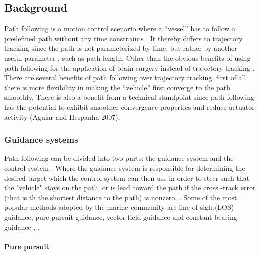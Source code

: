 
\subsection{Background}
Path following is a  motion control scenario where a “vessel” has to follow a predefined path without any time constraints \cite{caharija_integral_2016}. It thereby differs to trajectory tracking since the path is not parameterized by time, but rather by another useful parameter \cite{hung_review_2023}, such as path length. 
Other than the obvious benefits of using path following for the application of brain surgery instead of trajectory tracking  . There are several benefits of path following over trajectory tracking, first of all there is more flexibility in making the “vehicle” first converge to the path smoothly,  
There is also a benefit from a technical standpoint since path following has the potential to exhibit smoother convergence properties and reduce actuator activity (Aguiar and Hespanha 2007). 

\subsubsection{Guidance systems}
Path following can be divided into two parts: the guidance system and the control system \cite{qi_curve_2022}. Where the guidance system is responsible for determining the desired target which the control system can then use in order to steer such that the "vehicle" stays on the path, or is lead toward the path if the cross -track error (that is th the shortest distance to the path) is nonzero. . Some of the most popular methods adopted by the marine community are line-of-sight(LOS) guidance, pure pursuit guidance, vector field guidance and constant bearing guidance \cite{qi_curve_2022}, \cite{lekkas_integral_2014}. 

\paragraph*{Pure pursuit}


